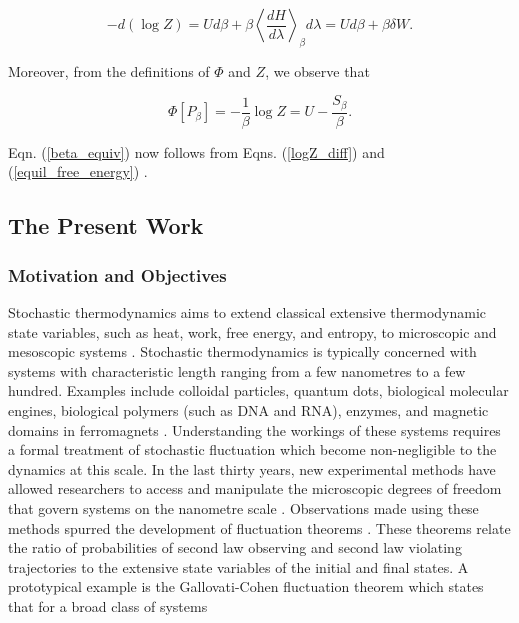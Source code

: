 \begin{equation}\label{logZ_diff}
  -d(\log Z) = U d\beta + \beta \left\langle\frac{dH}{d\lambda}\right\rangle_\beta d\lambda = U d\beta + \beta \delta W.
\end{equation}

Moreover, from the definitions of $\Phi$ and $Z$, we observe that

\begin{equation}\label{equil_free_energy}
  \Phi[P_\beta] = -\frac{1}{\beta}\log Z = U - \frac{S_\beta}{\beta}.
\end{equation}

Eqn. (\ref{beta_equiv}) now follows from  Eqns. (\ref{logZ_diff}) and (\ref{equil_free_energy}) \cite{parisi1998statistical}.


\subsection{The Present Work}

\subsubsection{Motivation and Objectives}
Stochastic thermodynamics aims to extend classical extensive thermodynamic state variables, such as heat, work, free energy, and entropy, to microscopic and mesoscopic systems \cite{peliti2021stochastic,esposito2012stochastic}. Stochastic thermodynamics is typically concerned with systems with characteristic length ranging from a few nanometres to a few hundred. Examples include colloidal particles, quantum dots, biological molecular engines, biological polymers (such as DNA and RNA), enzymes, and magnetic domains in ferromagnets \cite{seifert2012stochastic, esposito2012stochastic, bustamante2005nonequilibrium}. Understanding the workings of these systems requires a formal treatment of stochastic fluctuation which become non-negligible to the dynamics at this scale. In the last thirty years, new experimental methods have allowed researchers to access and manipulate the microscopic degrees of freedom that govern systems on the nanometre scale \cite{strick2000twisting}. Observations made using these methods spurred the development of fluctuation theorems \cite{sevick2008fluctuation}. These theorems relate the ratio of probabilities of second law observing and second law violating trajectories to the extensive state variables of the initial and final states. A prototypical example is the Gallovati-Cohen fluctuation theorem which states that for a broad class of systems \cite{gallavotti1995dynamical} 

